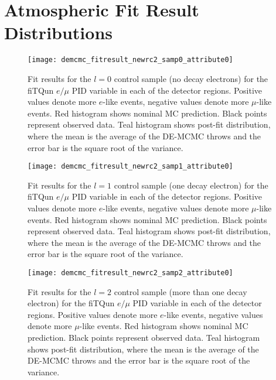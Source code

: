 \section{Atmospheric Fit Result Distributions}
\label{sec:fithistos}


\begin{figure}[h]
  \begin{center}
    \texttt{[image: demcmc\_fitresult\_newrc2\_samp0\_attribute0]} 
  \end{center}
  \caption{Fit results for the $l=0$ control sample (no decay electrons) for
  the fiTQun $e/\mu$ PID variable in each of the detector regions.  Positive
  values denote more $e$-like events, negative values denote more $\mu$-like
  events.  Red histogram shows nominal MC prediction.  Black points represent
  observed data.  Teal histogram shows post-fit distribution, where the mean is
  the average of the DE-MCMC throws and the error bar is the square root of the
  variance.}
  \label{fig:fitresults_samp0_att0}
\end{figure}


\begin{figure}[h]
  \begin{center}
    \texttt{[image: demcmc\_fitresult\_newrc2\_samp1\_attribute0]} 
  \end{center}
  \caption{Fit results for the $l=1$ control sample (one decay electron) for
  the fiTQun $e/\mu$ PID variable in each of the detector regions.  Positive
  values denote more $e$-like events, negative values denote more $\mu$-like
  events.  Red histogram shows nominal MC prediction.  Black points represent
  observed data.  Teal histogram shows post-fit distribution, where the mean is
  the average of the DE-MCMC throws and the error bar is the square root of the
  variance.}
  \label{fig:fitresults_samp1_att0}
\end{figure}


\begin{figure}[h]
  \begin{center}
    \texttt{[image: demcmc\_fitresult\_newrc2\_samp2\_attribute0]} 
  \end{center}
  \caption{Fit results for the $l=2$ control sample (more than one decay
  electron) for the fiTQun $e/\mu$ PID variable in each of the detector
  regions.  Positive values denote more $e$-like events, negative values denote
  more $\mu$-like events. Red histogram shows nominal MC prediction.  Black
  points represent observed data.  Teal histogram shows post-fit distribution,
  where the mean is the average of the DE-MCMC throws and the error bar is the
  square root of the variance.}
  \label{fig:fitresults_samp2_att0}
\end{figure}


